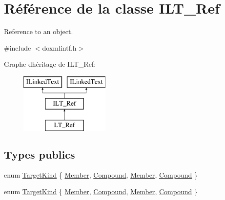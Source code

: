 \hypertarget{class_i_l_t___ref}{}\section{Référence de la classe I\+L\+T\+\_\+\+Ref}
\label{class_i_l_t___ref}


Reference to an object.  




{\ttfamily \#include $<$doxmlintf.\+h$>$}

Graphe d\textquotesingle{}héritage de I\+L\+T\+\_\+\+Ref\+:\begin{figure}[H]
\begin{center}
\leavevmode
\includegraphics[height=3.000000cm]{class_i_l_t___ref}
\end{center}
\end{figure}
\subsection*{Types publics}
\begin{DoxyCompactItemize}
\item 
enum \hyperlink{class_i_l_t___ref_a76e1fe83459ddebc82bea1930caf674d}{Target\+Kind} \{ \hyperlink{class_i_l_t___ref_a76e1fe83459ddebc82bea1930caf674da56ada5d7ed859cdcfcdb3913b49c910b}{Member}, 
\hyperlink{class_i_l_t___ref_a76e1fe83459ddebc82bea1930caf674da6f2f9b1bc15d2ddd11bf289a2268fd43}{Compound}, 
\hyperlink{class_i_l_t___ref_a76e1fe83459ddebc82bea1930caf674da56ada5d7ed859cdcfcdb3913b49c910b}{Member}, 
\hyperlink{class_i_l_t___ref_a76e1fe83459ddebc82bea1930caf674da6f2f9b1bc15d2ddd11bf289a2268fd43}{Compound}
 \}
\item 
enum \hyperlink{class_i_l_t___ref_a76e1fe83459ddebc82bea1930caf674d}{Target\+Kind} \{ \hyperlink{class_i_l_t___ref_a76e1fe83459ddebc82bea1930caf674da56ada5d7ed859cdcfcdb3913b49c910b}{Member}, 
\hyperlink{class_i_l_t___ref_a76e1fe83459ddebc82bea1930caf674da6f2f9b1bc15d2ddd11bf289a2268fd43}{Compound}, 
\hyperlink{class_i_l_t___ref_a76e1fe83459ddebc82bea1930caf674da56ada5d7ed859cdcfcdb3913b49c910b}{Member}, 
\hyperlink{class_i_l_t___ref_a76e1fe83459ddebc82bea1930caf674da6f2f9b1bc15d2ddd11bf289a2268fd43}{Compound}
 \}
\end{DoxyCompactItemize}
